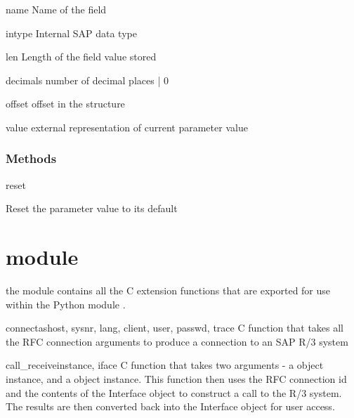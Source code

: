 \documentclass{howto}
\begin{document}
\begin{memberdesc}[field]{name}
    Name of the field
\end{memberdesc}

\begin{memberdesc}[field]{intype}
    Internal SAP data type
\end{memberdesc}

\begin{memberdesc}[field]{len}
     Length of the field value stored
\end{memberdesc}

\begin{memberdesc}[field]{decimals}
     number of decimal places  | 0
\end{memberdesc}

\begin{memberdesc}[field]{offset}
     offset in the structure
\end{memberdesc}

\begin{memberdesc}[field]{value}
     external representation of current parameter value
\end{memberdesc}


\subsubsection{Methods \label{fieldmeths}}

\begin{methoddesc}[field]{reset}{}

Reset the parameter value to its default

\end{methoddesc}



\section{module  \label{modsaprfcutil}}

the  module contains all the C extension functions that are exported 
for use within the Python module .

\begin{funcdesc}{connect}{ashost, sysnr, lang, client, user, passwd, trace}
C function that takes all the RFC connection arguments to produce a connection to
an SAP R/3 system
\end{funcdesc}

\begin{funcdesc}{call_receive}{instance, iface}
C function that takes two arguments - a  object instance, and a
 object instance.  This function then uses the RFC connection id
and the contents of the Interface object to construct a call to the R/3 system.
The results are then converted back into the Interface object for user access.
\end{funcdesc}
\end{document}
